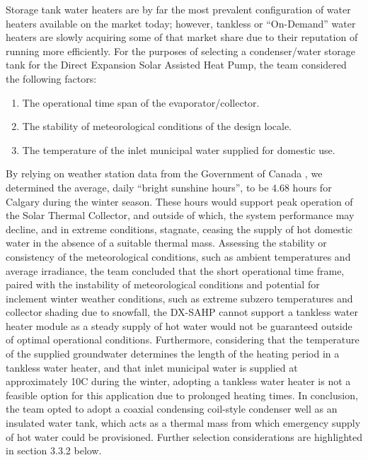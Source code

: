 Storage tank water heaters are by far the most prevalent configuration of water heaters available on the market today; however, tankless or “On-Demand” water heaters are slowly acquiring some of that market share due to their reputation of running more efficiently. For the purposes of selecting a condenser/water storage tank for the Direct Expansion Solar Assisted Heat Pump, the team considered the following factors:

\medskip
\begin{enumerate}[itemsep=3mm, parsep=-1mm, label=\roman*.]
    \item The operational time span of the evaporator/collector.
    \item The stability of meteorological conditions of the design locale.
    \item The temperature of the inlet municipal water supplied for domestic use.
\end{enumerate}

\medskip
By relying on weather station data from the Government of Canada \cite{climate_summary}, we determined the average, daily “bright sunshine hours”, to be 4.68 hours for Calgary during the winter season. These hours would support peak operation of the Solar Thermal Collector, and outside of which, the system performance may decline, and in extreme conditions, stagnate, ceasing the supply of hot domestic water in the absence of a suitable thermal mass. Assessing the stability or consistency of the meteorological conditions, such as ambient temperatures and average irradiance, the team concluded that the short operational time frame, paired with the instability of meteorological conditions and potential for inclement winter weather conditions, such as extreme subzero temperatures and collector shading due to snowfall, the DX-SAHP cannot support a tankless water heater module as a steady supply of hot water would not be guaranteed outside of optimal operational conditions. Furthermore, considering that the temperature of the supplied groundwater determines the length of the heating period in a tankless water heater, and that inlet municipal water is supplied at approximately 10\textdegree C during the winter, adopting a tankless water heater is not a feasible option for this application due to prolonged heating times. In conclusion, the team opted to adopt a coaxial condensing coil-style condenser well as an insulated water tank, which acts as a thermal mass from which emergency supply of hot water could be provisioned. Further selection considerations are highlighted in section 3.3.2 below.

